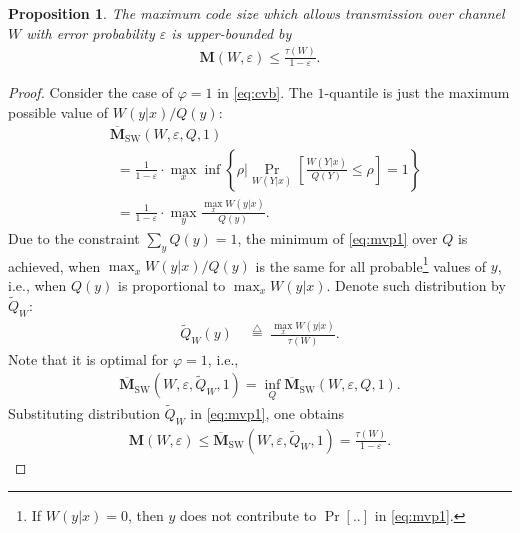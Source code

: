 \documentclass[10pt,a4paper]{amsart}
\newtheorem{proposition}{Proposition}
\newcommand{\bfM}{{\mathbf{M}}}
\newcommand{\brsq}[1]{{\left[{#1}\right]}}
\newcommand{\defeq}{{\overset{\triangle}{=}}}
\newcommand{\obfM}{{\overline{\mathbf{M}}}}
\newcommand{\set}[1]{{\left\{{#1}\right\}}}
\newcommand{\tQ}{{\widetilde{Q}}}
\newcommand{\ve}{\varepsilon}
\newcommand{\vp}{\varphi}
\begin{document}
\begin{proposition}
\label{p:mocvb}
The maximum code size which allows transmission over channel $W$ with error probability $\ve$ is upper-bounded by
\begin{align}
\bfM(W, \ve) \leq \frac{\tau(W)}{1-\ve}.
\label{eq:p1w}
\end{align}
\end{proposition}

\begin{proof}
Consider the case of $\vp=1$ in \eqref{eq:cvb}.
The $1$-quantile is just the maximum possible value of $W(y|x)/Q(y)$:
\begin{align}
&\obfM_{\text{SW}}(W,\ve,Q,1) 
\nonumber\\ & \ \ =
 \frac{1}{1 - \ve} \cdot \max_x\inf \set{\rho\bigg| \Pr_{W(Y|x)}\brsq{\frac{W(Y|x)}{Q(Y)}\leq  \rho}= 1}
\nonumber\\ &
\ \ = \frac{1}{1 - \ve} \cdot \max_y \frac{\max_x W(y|x)}{Q(y)}.
\label{eq:mvp1}
\end{align}
Due to the constraint $\sum_y Q(y)=1$, the minimum of \eqref{eq:mvp1} over $Q$ is achieved, when $\max_x W(y|x)/Q(y)$ is the same for all probable\footnote{If $W(y|x)=0$, then $y$ does not contribute to $\Pr[..]$ in \eqref{eq:mvp1}.} values of $y$, i.e., when $Q(y)$ is proportional to $\max_x W(y|x)$.
Denote such distribution by $\tQ_W$: 
{\allowdisplaybreaks
\begin{align}
\tQ_W(y)&\;\defeq\;\frac{\max_x W(y|x)}{\tau(W)}.
\label{eq:tQ}
\end{align}
}%
Note that it is optimal for $\vp=1$, i.e., 
\begin{align}
\obfM_\text{SW}(W,\ve,\tQ_W,1)=\inf_Q\obfM_\text{SW}(W,\ve,Q,1).
\label{eq:tQopt}
\end{align}
Substituting distribution $\tQ_W$ in \eqref{eq:mvp1}, one obtains
\begin{align}
\bfM(W,\ve)\leq \obfM_\text{SW}(W,\ve,\tQ_W,1)=\frac{\tau(W)}{1-\ve}.
\label{eq:cvbs}
\end{align}
\end{proof}
\end{document}
